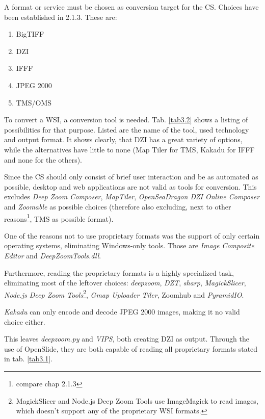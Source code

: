 A format or service must be chosen as conversion target for the CS. Choices have been established in 2.1.3. These are:
\begin{enumerate}[(1)]
	\item BigTIFF
	\item DZI
	\item IFFF
	\item JPEG 2000
	\item TMS/OMS
\end{enumerate}

To convert a WSI, a conversion tool is needed. Tab. \ref{tab3.2} shows a listing of possibilities for that purpose. Listed are the name of the tool, used technology and output format. It shows clearly, that DZI has a great variety of options, while the alternatives have little to none (Map Tiler for TMS, Kakadu for IFFF and none for the others).

Since the CS should only consist of brief user interaction and be as automated as possible, desktop and web applications are not valid as tools for conversion. This excludes \emph{Deep Zoom Composer}, \emph{MapTiler}, \emph{OpenSeaDragon DZI Online Composer} and \emph{Zoomable} as possible choices (therefore also excluding, next to other reasons\footnote{compare chap 2.1.3}, TMS as possible format).

One of the reasons not to use proprietary formats was the support of only certain operating systems, eliminating Windows-only tools. Those are \emph{Image Composite Editor} and \emph{DeepZoomTools.dll}.

Furthermore, reading the proprietary formats is a highly specialized task, eliminating most of the leftover choices: \emph{deepzoom}\cite{web:deepzoom}, \emph{DZT}\cite{web:dzt}, \emph{sharp}\cite{web:sharp}, \emph{MagickSlicer}, \emph{Node.js Deep Zoom Tools}\footnote{MagickSlicer and Node.js Deep Zoom Tools use ImageMagick to read images, which doesn't support any of the proprietary WSI formats\cite{web:imagemagick}.}, \emph{Gmap Uploader Tiler}\cite{web:gmap}, Zoomhub\cite{web:zoomhub} and \emph{PyramidIO}\cite{web:pyramidio}.

\emph{Kakadu} can only encode and decode JPEG 2000 images\cite{web:openseadragon}, making it no valid choice either.

This leaves \emph{deepzoom.py} and \emph{VIPS}, both creating DZI as output. Through the use of OpenSlide, they are both capable of reading all proprietary formats stated in tab. \ref{tab3.1}\cite{web:openslide}.


